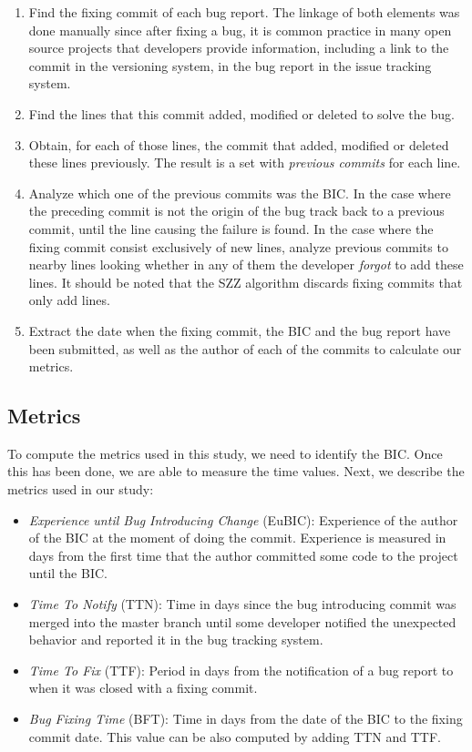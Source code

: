\documentclass[10pt, conference]{IEEEtran}
\begin{document}
\begin{enumerate}
		\item Find the fixing commit of each bug report. The linkage of both elements was done manually since after fixing a bug, it is common practice in many open source projects that developers provide information, including a link to the commit in the versioning system, in the bug report in the issue tracking system. 		
		\item Find the lines that this commit added, modified or deleted to solve the bug.
		\item Obtain, for each of those lines, the commit that added, modified or deleted these lines previously. The result is a set with \emph{previous commits} for each line.
		\item Analyze which one of the previous commits was the BIC. In the case where the preceding commit is not the origin of the bug track back to a previous commit, until the line causing the failure is found. In the case where the fixing commit consist exclusively of new lines, analyze previous commits to nearby lines looking whether in any of them the developer \emph{forgot} to add these lines. It should be noted that the SZZ algorithm discards fixing commits that only add lines.
		\item Extract the date when the fixing commit, the BIC and the bug report have been submitted, as well as the author of each of the commits to calculate our metrics.	
\end{enumerate} 


\subsection{Metrics}

To compute the metrics used in this study, we need to identify the BIC. Once this has been done, we are able to measure the time values. Next, we describe the metrics used in our study: 

\begin{itemize}
		\item \emph{Experience until Bug Introducing Change} (EuBIC): Experience of the author of the BIC at the moment of doing the commit. Experience is measured in days from the first time that the author committed some code to the project until the BIC.
		\item \emph{Time To Notify} (TTN): Time in days since the bug introducing commit was merged into the master branch until some developer notified the unexpected behavior and reported it in the bug tracking system. 
		\item \emph{Time To Fix} (TTF): Period in days from the notification of a bug report to when it was closed with a fixing commit.
		\item \emph{Bug Fixing Time} (BFT): Time in days from the date of the BIC to the fixing commit date. This value can be also computed by adding TTN and TTF.
\end{itemize} 
\end{document}
